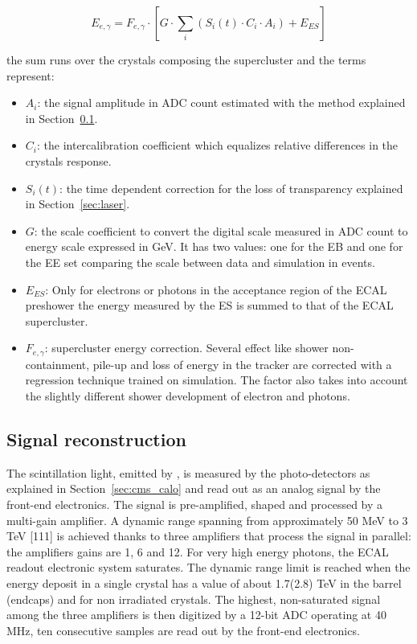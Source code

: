\begin{equation}
  E_{e,\gamma} = F_{e,\gamma} \cdot \left[ G \cdot \sum_{i} ( S_i(t)\cdot C_i \cdot A_i ) + E_{ES} \right]
\end{equation}

the sum runs over the crystals composing the supercluster and the terms represent:

\begin{itemize}
\item $A_i$: the signal amplitude in ADC count estimated with the method explained in Section~\ref{sec:signal_reco}.
\item $C_i$: the intercalibration coefficient which equalizes relative differences in the crystals response.
\item $S_i(t)$: the time dependent correction for the loss of transparency explained in Section~\ref{sec:laser}.
\item $G$: the scale coefficient to convert the digital scale measured in ADC count to energy scale expressed in GeV.
  It has two values:
  one for the EB and one for the EE set comparing the scale between data and simulation in \Zee events.
\item $E_{ES}$: Only for electrons or photons in the acceptance region of the ECAL preshower the energy measured
  by the ES is summed to that of the ECAL supercluster.
\item $F_{e,\gamma}$: supercluster energy correction. Several effect like shower non-containment, pile-up and
  loss of energy in the tracker are corrected with a regression technique trained on simulation. The factor also
  takes into account the slightly different shower development of electron and photons.
\end{itemize}

\subsection{Signal reconstruction}
\label{sec:signal_reco}
The scintillation light, emitted by \PbWO , is measured by the photo-detectors as explained in
Section~\ref{sec:cms_calo} and read
out as an analog signal by the front-end electronics. The signal is pre-amplified, shaped
and processed by a multi-gain amplifier. A dynamic range spanning from
approximately 50 MeV to 3 TeV [111] is achieved thanks to three
amplifiers that process the signal in parallel: the amplifiers gains are 1, 6 and 12.
For very high energy photons, the ECAL readout electronic system saturates.
The dynamic range limit is reached when the energy
deposit in a single crystal has a value of about 1.7(2.8) TeV in the barrel (endcaps) and for
non irradiated crystals. The highest, non-saturated signal among the three amplifiers is then digitized by a 12-bit
ADC operating at 40 MHz, ten consecutive samples are read out by the front-end electronics.


